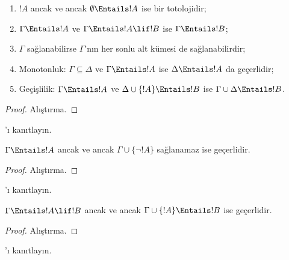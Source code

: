 \documentclass[../../../include/open-logic-section]{subfiles}
\begin{document}
\begin{prop}
\begin{enumerate} 
\item $!A$ ancak ve ancak $\emptyset \Entails !A$ ise bir totolojidir; 
\item $\Gamma \Entails !A$ ve $\Gamma \Entails !A \lif !B$ ise
  $\Gamma \Entails !B$;
\item $\Gamma$ sağlanabilirse $\Gamma$'nın her sonlu alt kümesi de
  sağlanabilirdir; 
\item {} Monotonluk: $\Gamma \subseteq \Delta$ ve
  $\Gamma \Entails !A$ ise $\Delta \Entails !A$ da geçerlidir;
\item {} Geçişlilik: $\Gamma \Entails !A$ ve
  $\Delta \cup \{ !A\} \Entails !B$ ise $\Gamma \cup \Delta \Entails
  !B$.
\end{enumerate}
\end{prop}

\begin{proof}
Alıştırma.
\end{proof}

\begin{prob}
'ı kanıtlayın.
\end{prob}

\begin{prop}
  $\Gamma \Entails !A$ ancak ve ancak $\Gamma \cup \{\lnot !A\}$
  sağlanamaz ise geçerlidir.
\end{prop}

\begin{proof}
Alıştırma.
\end{proof}

\begin{prob}
'ı kanıtlayın.
\end{prob}

\begin{thm}
   $\Gamma \Entails !A \lif !B$ ancak ve ancak
  $\Gamma \cup \{!A\} \Entails !B$ ise geçerlidir.
\end{thm}

\begin{proof}
Alıştırma.
\end{proof}

\begin{prob}
'ı kanıtlayın.
\end{prob}
\end{document}
